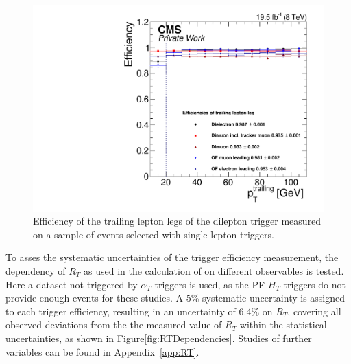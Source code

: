 \begin{figure}
\begin{center}
\includegraphics[scale=0.35]{plots/BG/trigger/Triggereff_SingleLepton_HighHTExclusive_Full2012_TrailingPt_leadingPt30Single.pdf}
\caption{Efficiency of the trailing lepton legs of the dilepton trigger measured on a sample of events selected with single lepton triggers.}
\label{fig:triggerEffTrailing}
\end{center}
\end{figure} 
To asses the systematic uncertainties of the trigger efficiency measurement, the dependency of $R_T$ as used in the calculation of \Rsfof on different observables is tested. Here a dataset not triggered by $\alpha_T$ triggers is used, as the PF $H_T$ triggers do not provide enough events for these studies. A 5\% systematic uncertainty is assigned to each trigger efficiency, resulting in an uncertainty of 6.4\% on $R_T$, covering all observed deviations from the the measured value of $R_T$ within the statistical uncertainties, as shown in Figure\ref{fig:RTDependencies}. Studies of further variables can be found in Appendix~\ref{app:RT}.
